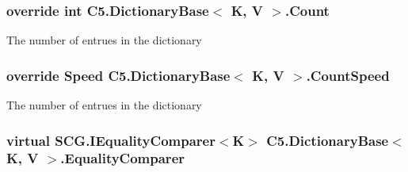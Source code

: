\hypertarget{class_c5_1_1_dictionary_base_adcf48a45f296db6a12893ad7b13abb02}{}
\subsubsection[{Count}]{\setlength{\rightskip}{0pt plus 5cm}override int {\bf C5.\+Dictionary\+Base}$<$ K, V $>$.Count\hspace{0.3cm}{\ttfamily [get]}}\label{class_c5_1_1_dictionary_base_adcf48a45f296db6a12893ad7b13abb02}




The number of entrues in the dictionary\hypertarget{class_c5_1_1_dictionary_base_a6101979f24376d2e8640394e66264210}{}
\subsubsection[{Count\+Speed}]{\setlength{\rightskip}{0pt plus 5cm}override {\bf Speed} {\bf C5.\+Dictionary\+Base}$<$ K, V $>$.Count\+Speed\hspace{0.3cm}{\ttfamily [get]}}\label{class_c5_1_1_dictionary_base_a6101979f24376d2e8640394e66264210}




The number of entrues in the dictionary\hypertarget{class_c5_1_1_dictionary_base_a63cd9471d097f20096d8e3bb22fffa33}{}
\subsubsection[{Equality\+Comparer}]{\setlength{\rightskip}{0pt plus 5cm}virtual S\+C\+G.\+I\+Equality\+Comparer$<$K$>$ {\bf C5.\+Dictionary\+Base}$<$ K, V $>$.Equality\+Comparer\hspace{0.3cm}{\ttfamily [get]}}\label{class_c5_1_1_dictionary_base_a63cd9471d097f20096d8e3bb22fffa33}




\hypertarget{class_c5_1_1_dictionary_base_afd227ddeb666195929f2b441b0c07bb7}{}
